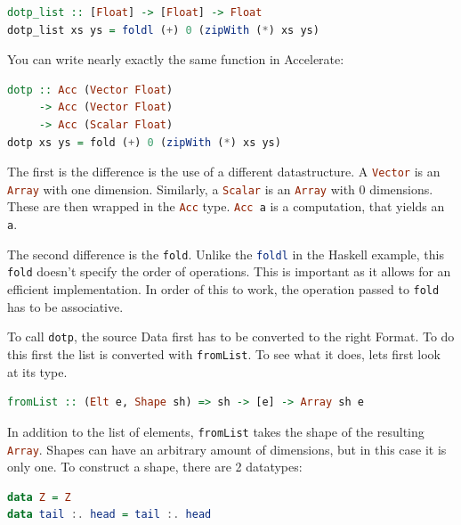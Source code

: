 \documentclass[a4paper,bibliography=totocnumbered,parskip,headsepline]{scrbook}
\begin{document}
\begin{lstlisting}[language=haskell]
dotp_list :: [Float] -> [Float] -> Float
dotp_list xs ys = foldl (+) 0 (zipWith (*) xs ys)
\end{lstlisting}

You can write nearly exactly the same function in Accelerate:

\begin{lstlisting}[language=haskell]
dotp :: Acc (Vector Float)
     -> Acc (Vector Float)
     -> Acc (Scalar Float)
dotp xs ys = fold (+) 0 (zipWith (*) xs ys)
\end{lstlisting}

The first is the difference is the use of a different datastructure.
A \lstinline[language=haskell]!Vector! is an \lstinline[language=haskell]!Array! with one dimension.
Similarly, a \lstinline[language=haskell]!Scalar! is an \lstinline[language=haskell]!Array! with 0 dimensions.
These are then wrapped in the \lstinline[language=haskell]!Acc! type.
\lstinline[language=haskell]!Acc a! is a computation, that yields an \lstinline[language=haskell]!a!.

The second difference is the \lstinline[language=haskell]!fold!.
Unlike the \lstinline[language=haskell]!foldl! in the Haskell example, this \lstinline[language=haskell]!fold! doesn't specify the order of operations.
This is important as it allows for an efficient implementation.
In order of this to work, the operation passed to \lstinline[language=haskell]!fold! has to be associative.

To call \lstinline[language=haskell]!dotp!, the source Data first has to be converted to the right Format.
To do this first the list is converted with \lstinline[language=haskell]!fromList!.
To see what it does, lets first look at its type.

\begin{lstlisting}[language=haskell]
fromList :: (Elt e, Shape sh) => sh -> [e] -> Array sh e
\end{lstlisting}

In addition to the list of elements, \lstinline[language=haskell]!fromList! takes the shape of the resulting \lstinline[language=haskell]!Array!.
Shapes can have an arbitrary amount of dimensions, but in this case it is only one.
To construct a shape, there are 2 datatypes:

\begin{lstlisting}[language=haskell]
data Z = Z
data tail :. head = tail :. head
\end{lstlisting}
\end{document}
